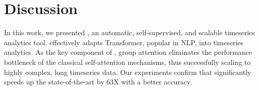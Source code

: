 \section{Discussion}
\label{sec.discussion}
In this work, we presented \system, an automatic, self-supervised, and scalable timeseries analytics tool. \system effectively adapts Transformer, popular in NLP, into timeseries analytics. 
As the key component of \system,  group attention  eliminates the performance bottleneck of the classical self-attention mechanisms, thus successfully scaling \system to highly complex, long timeseries data.
Our experiments confirm that \system significantly speeds up the state-of-the-art by 63X with a better accuracy. 
